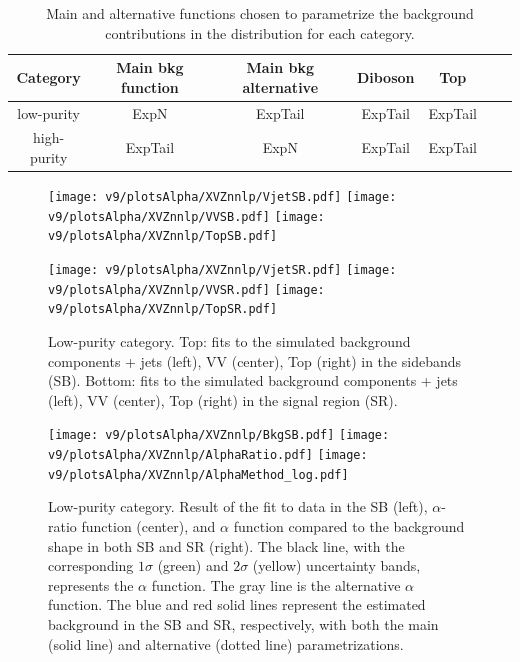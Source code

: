 \begin{table}[!htb]
  \begin{center}
  \caption{Main and alternative functions chosen to parametrize the background contributions in the \mtVZ distribution for each category.}\label{tab:XMassFunctions}
    \begin{tabular}{c|cccccc}
      Category & Main bkg function & Main bkg alternative & Diboson & Top \\
      \hline
       \hline
       low-purity  & ExpN & ExpTail & ExpTail & ExpTail \\
      \hdashline
       high-purity  & ExpTail & ExpN & ExpTail & ExpTail \\
    \end{tabular}
  \end{center}

\end{table}

\begin{figure}[!htb]
  \centering
    \texttt{[image: v9/plotsAlpha/XVZnnlp/VjetSB.pdf]}
    \texttt{[image: v9/plotsAlpha/XVZnnlp/VVSB.pdf]}
    \texttt{[image: v9/plotsAlpha/XVZnnlp/TopSB.pdf]}

    \texttt{[image: v9/plotsAlpha/XVZnnlp/VjetSR.pdf]}
    \texttt{[image: v9/plotsAlpha/XVZnnlp/VVSR.pdf]}
    \texttt{[image: v9/plotsAlpha/XVZnnlp/TopSR.pdf]}
    \caption{Low-purity category. Top: fits to the simulated background components \V + jets (left), VV (center), Top (right) in the sidebands (SB). Bottom: fits to the simulated background components \V + jets (left), VV (center), Top (right) in the signal region (SR).}
  \label{fig:XVZnnlp}
\end{figure}

\begin{figure}[!htb]
  \centering
    \texttt{[image: v9/plotsAlpha/XVZnnlp/BkgSB.pdf]}
    \texttt{[image: v9/plotsAlpha/XVZnnlp/AlphaRatio.pdf]}
    \texttt{[image: v9/plotsAlpha/XVZnnlp/AlphaMethod\_log.pdf]}
  \caption{Low-purity category. Result of the fit to data in the SB (left), $\alpha$-ratio function (center), and $\alpha$ function compared to the background shape in both SB and SR (right). The black line, with the corresponding $1\sigma$ (green) and $2\sigma$ (yellow) uncertainty bands, represents the $\alpha$ function. The gray line is the alternative $\alpha$ function. The blue and red solid lines represent the estimated background in the SB and SR, respectively, with both the main (solid line) and alternative (dotted line) parametrizations.}
  \label{fig:XVZnnlp_Alpha}
\end{figure}


